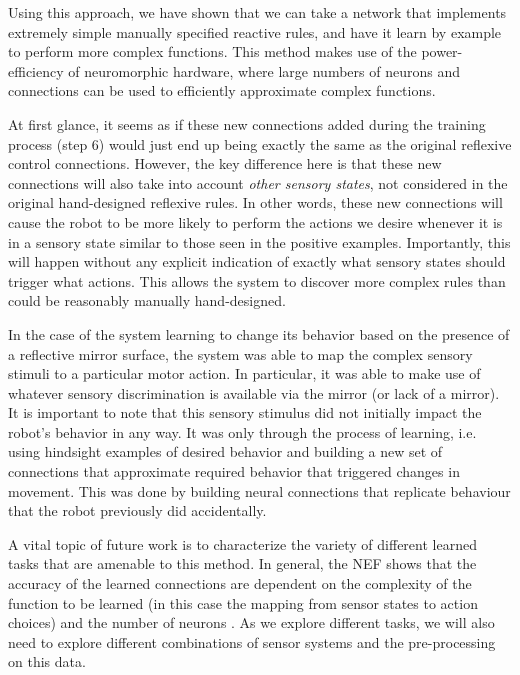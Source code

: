\documentclass{frontiersSCNS}
\begin{document}
Using this approach, we have shown that we can take a network that
implements extremely simple manually specified reactive rules, and have
it learn by example to perform more complex functions.  This method
makes use of the power-efficiency of neuromorphic hardware, where large
numbers of neurons and connections can be used to efficiently
approximate complex functions.

At first glance, it seems as if these new connections added during the
training process (step 6) would just end up being 
exactly the same as the original reflexive control connections. However, the 
key difference here is that these new connections will also take into 
account \textit{other sensory states}, not considered in the original 
hand-designed reflexive rules. In other words, these new connections will 
cause the robot to be more likely to perform the actions we desire whenever it is in a sensory state similar to those seen in the positive examples. 
Importantly, this will happen without any explicit indication of exactly what 
sensory states should trigger what actions.  This allows the system to
discover more complex rules than could be reasonably manually hand-designed.

In the case of the system learning to change its behavior based on the 
presence of a reflective mirror surface, the system was able to map the 
complex sensory stimuli to a particular motor action.  In particular, it
was able to make use of whatever sensory discrimination is available via
the mirror (or lack of a mirror).  It is important to note that this sensory 
stimulus did not initially impact the robot's behavior in any way. It was 
only through the process of learning, i.e. using hindsight examples of desired 
behavior and building a new set of connections that approximate required 
behavior that triggered changes in movement.  This was done by building neural
connections that replicate behaviour that the robot previously did accidentally.

A vital topic of future work is to characterize the variety of different
learned tasks that are amenable to this method.  In general, the NEF shows
that the accuracy of the learned connections are dependent on the complexity
of the function to be learned (in this case the mapping from sensor states to
action choices) and the number of neurons \citep{eliasmith2004neural}.  As we explore different tasks,
we will also need to explore different combinations of sensor systems and
the pre-processing on this data.  
\end{document}
